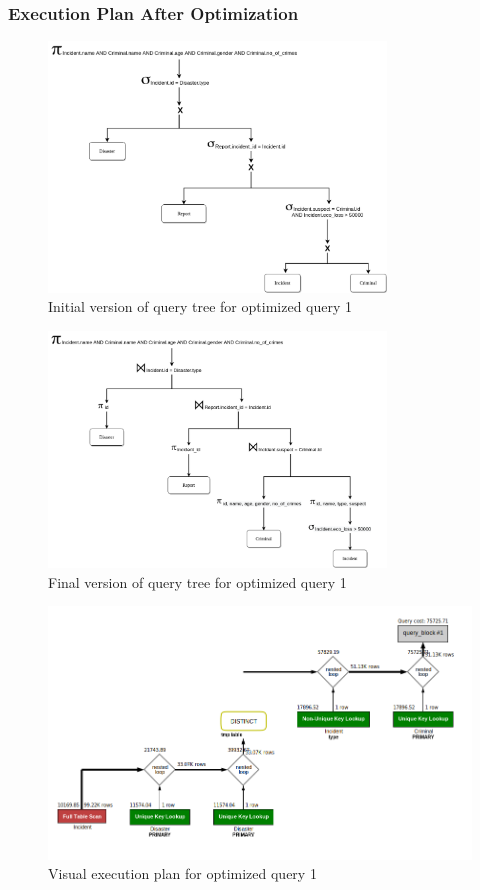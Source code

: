 \subsubsection{Execution Plan After Optimization}
\begin{figure}[H]
    \centering
    \includegraphics[width=0.8\textwidth]{images/query_trees/query1-optimized-initial-version.png}
    \caption{Initial version of query tree for optimized query 1}
\end{figure}
\begin{figure}[H]
    \centering
    \includegraphics[width=0.8\textwidth]{images/query_trees/query1-optimized-final-version.png}
    \caption{Final version of query tree for optimized query 1}
\end{figure}
\begin{figure}[H]
    \centering
    \includegraphics[width=\textwidth]{images/execution_plans/q1-3-new.png}
    \caption{Visual execution plan for optimized query 1}
\end{figure}

